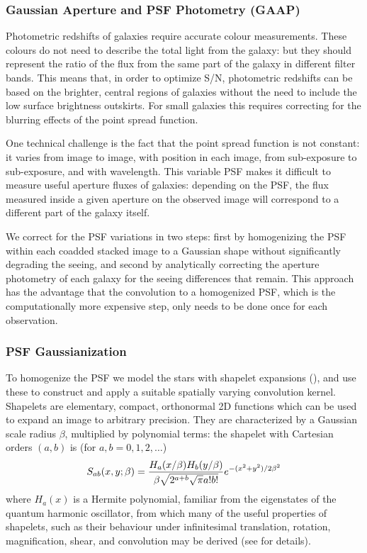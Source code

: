 \subsubsection{Gaussian Aperture and PSF Photometry (GAAP)}

Photometric redshifts of galaxies require accurate colour measurements. These colours do not need to describe the total light from the galaxy: but they should represent the ratio of the flux from the same part of the galaxy in different filter bands. This means that, in order to optimize S/N, photometric redshifts can be based on the brighter, central regions of galaxies without the need to include the low surface brightness outskirts.
For small galaxies this requires correcting for the blurring effects of the point spread function.

One technical challenge is the fact that the point spread function is not constant: it varies from image to image, with position in each image, from sub-exposure to sub-exposure, and with wavelength. 
This variable PSF makes it difficult to measure useful aperture fluxes of galaxies: depending on the PSF, the flux measured inside a given aperture on the observed image will correspond to a different part of the galaxy itself.

We correct for the PSF variations in two steps: first by homogenizing the PSF within each coadded stacked image to a Gaussian shape without significantly degrading the seeing, and second by analytically correcting the aperture photometry of each galaxy for the seeing differences that remain. This approach has the advantage that the convolution to a homogenized PSF, which is the computationally more expensive step, only needs to be done once for each observation.

\subsubsection{PSF Gaussianization}

To homogenize the PSF we model the stars with shapelet expansions (\cite{Refregier2001}), and use these to construct and apply a suitable spatially varying convolution kernel. Shapelets are elementary, compact, orthonormal 2D functions which can be used to expand an image to arbitrary precision. They are characterized by a Gaussian scale radius $\beta$, multiplied by polynomial terms: the shapelet with Cartesian orders $(a,b)$ is (for $a,b=0,1,2,\ldots$)
\[
S_{ab}(x,y;\beta)={H_a(x/\beta)H_b(y/\beta) \over \beta\sqrt{2^{a+b}\sqrt\pi a! b!}}  e^{-(x^2+y^2)/2\beta^2} 
\]
where $H_a(x)$ is a Hermite polynomial, familiar from the eigenstates of the quantum harmonic oscillator, from which many of the useful properties of shapelets, such as their behaviour under infinitesimal translation, rotation, magnification, shear, and convolution may be derived (see \cite{Refregier2001} for details).  

